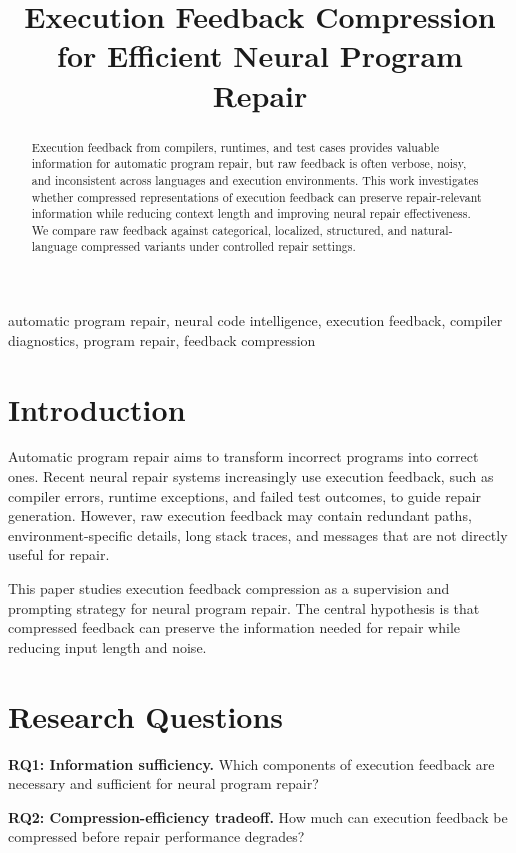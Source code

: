 \documentclass[conference]{IEEEtran}
\title{Execution Feedback Compression for Efficient Neural Program Repair}
\author{
\IEEEauthorblockN{Deepak Naik M. V. and J. Swaminathan}
\IEEEauthorblockA{
Department of Computer Science and Engineering\\
Amrita School of Computing, Amrita Vishwa Vidyapeetham\\
Amritapuri, India\\
}
}
\begin{document}
\maketitle

\begin{abstract}
Execution feedback from compilers, runtimes, and test cases provides valuable information for automatic program repair, but raw feedback is often verbose, noisy, and inconsistent across languages and execution environments. This work investigates whether compressed representations of execution feedback can preserve repair-relevant information while reducing context length and improving neural repair effectiveness. We compare raw feedback against categorical, localized, structured, and natural-language compressed variants under controlled repair settings.
\end{abstract}

\begin{IEEEkeywords}
automatic program repair, neural code intelligence, execution feedback, compiler diagnostics, program repair, feedback compression
\end{IEEEkeywords}

\section{Introduction}

Automatic program repair aims to transform incorrect programs into correct ones. Recent neural repair systems increasingly use execution feedback, such as compiler errors, runtime exceptions, and failed test outcomes, to guide repair generation. However, raw execution feedback may contain redundant paths, environment-specific details, long stack traces, and messages that are not directly useful for repair.

This paper studies execution feedback compression as a supervision and prompting strategy for neural program repair. The central hypothesis is that compressed feedback can preserve the information needed for repair while reducing input length and noise.

\section{Research Questions}

\textbf{RQ1: Information sufficiency.} Which components of execution feedback are necessary and sufficient for neural program repair?

\textbf{RQ2: Compression-efficiency tradeoff.} How much can execution feedback be compressed before repair performance degrades?
\end{document}
